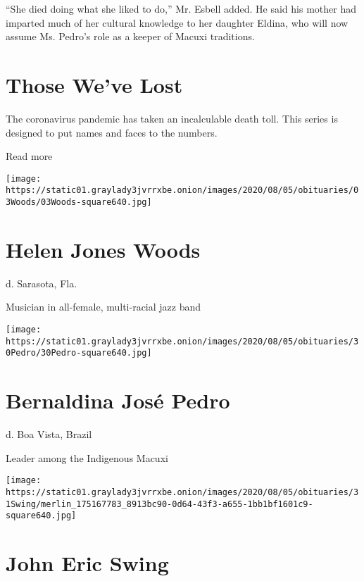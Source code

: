 ``She died doing what she liked to do,'' Mr. Esbell added. He said his
mother had imparted much of her cultural knowledge to her daughter
Eldina, who will now assume Ms. Pedro's role as a keeper of Macuxi
traditions.

\href{https://www.nytimes3xbfgragh.onion/interactive/2020/obituaries/people-died-coronavirus-obituaries.html?action=click\&pgtype=Article\&state=default\&region=BELOW_MAIN_CONTENT\&context=covid_obits_promo}{}

\hypertarget{those-weve-lost}{%
\section{Those We've Lost}\label{those-weve-lost}}

The coronavirus pandemic has taken an incalculable death toll. This
series is designed to put names and faces to the numbers.

Read more

\texttt{[image: https://static01.graylady3jvrrxbe.onion/images/2020/08/05/obituaries/03Woods/03Woods-square640.jpg]}

\hypertarget{helen-jones-woods}{%
\section{Helen Jones Woods}\label{helen-jones-woods}}

d. Sarasota, Fla.

Musician in all-female, multi-racial jazz band

\texttt{[image: https://static01.graylady3jvrrxbe.onion/images/2020/08/05/obituaries/30Pedro/30Pedro-square640.jpg]}

\hypertarget{bernaldina-josuxe9-pedro}{%
\section{Bernaldina José Pedro}\label{bernaldina-josuxe9-pedro}}

d. Boa Vista, Brazil

Leader among the Indigenous Macuxi

\texttt{[image: https://static01.graylady3jvrrxbe.onion/images/2020/08/05/obituaries/31Swing/merlin\_175167783\_8913bc90-0d64-43f3-a655-1bb1bf1601c9-square640.jpg]}

\hypertarget{john-eric-swing}{%
\section{John Eric Swing}\label{john-eric-swing}}

